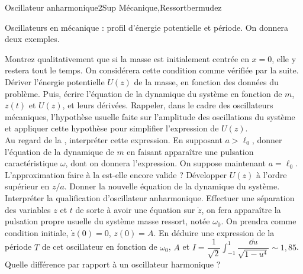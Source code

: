 
\begin{exercise}{Oscillateur anharmonique}{2}{Sup}
{Mécanique,Ressort}{bermudez}

\begin{questions}
    \questioncours Oscillateurs en mécanique : profil d'énergie potentielle et période. On donnera deux exemples.
    
    \question Montrez qualitativement que si la masse est initialement centrée en $x=0$, elle y restera tout le temps. On considérera cette condition comme vérifiée par la suite.
    \question Dériver l'énergie potentielle $U(z)$ de la masse, en fonction des données du problème. Puis, écrire l'équation de la dynamique du système en fonction de $m$, $z(t)$ et $U(z)$, et leurs dérivées.
    \question Rappeler, dans le cadre des oscillateurs mécaniques, l'hypothèse usuelle faite sur l'amplitude des oscillations du système et appliquer cette hypothèse pour simplifier l'expression de $U(z)$. \\Au regard de la , interpréter cette expression.
    \question En supposant $a > \ell_0$, donner l'équation de la dynamique de $m$ en faisant apparaître une pulsation caractéristique $\omega$, dont on donnera l'expression.
    \question On suppose maintenant $a = \ell_0$. L'approximation faire à la  est-elle encore valide ? Développer $U(z)$ à l'ordre supérieur en $z/a$.
    \question Donner la nouvelle équation de la dynamique du système. Interpréter la qualification d'oscillateur anharmonique.
    \question Effectuer une séparation des variables $z$ et $t$ de sorte à avoir une équation sur $\dot{z}$, on fera apparaître la pulsation propre usuelle du système masse ressort, notée $\omega_0$. On prendra comme condition initiale, $\dot{z}(0) = 0$, $z(0) = A$.
    \question En déduire une expression de la période $T$ de cet oscillateur en fonction de $\omega_0$, $A$ et $I = \dfrac{1}{\sqrt{2}} \int_{-1}^1 \dfrac{\dd{u}}{\sqrt{1-u^4}} \sim 1,85$.
    \question Quelle différence par rapport à un oscillateur harmonique ?
\end{questions}

\end{exercise}